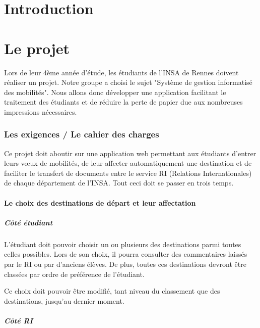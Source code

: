 \documentclass[10pt,a4paper]{article}
\begin{document}
	\part{Introduction}
	
	
	\part{Le projet}
	 Lors de leur 4ème année d'étude, les étudiants de l'INSA de Rennes doivent réaliser un projet. Notre groupe a choisi le sujet "Système de gestion informatisé des mobilités". Nous allons donc développer une application facilitant le traitement des étudiants et de réduire la perte de papier due aux nombreuses impressions nécessaires.
		
		\section{Les exigences / Le cahier des charges}
		
		Ce projet doit aboutir sur une application web permettant aux étudiants d'entrer leurs vœux de mobilités, de leur affecter automatiquement une destination et de faciliter le transfert de documents entre le service RI (Relations Internationales) de chaque département de l'INSA. Tout ceci doit se passer en trois temps.
		
		 \subsection{Le choix des destinations de départ et leur affectation}
		 
		 \subsubsection{Côté étudiant}
		 
		 L'étudiant doit pouvoir choisir un ou plusieurs des destinations parmi toutes celles possibles. Lors de son choix, il pourra consulter des commentaires laissés par le RI ou par d'anciens élèves. De plus, toutes ces destinations devront être classées par ordre de préférence de l'étudiant.
		 
		 Ce choix doit pouvoir être modifié, tant niveau du classement que des destinations, jusqu'au dernier moment.
		 
		\subsubsection{Côté RI}
		
\end{document}
